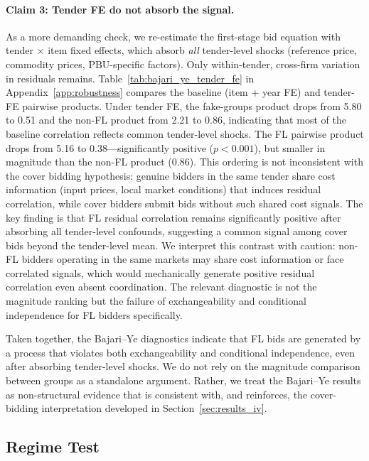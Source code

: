 \paragraph{Claim 3: Tender FE do not absorb the signal.}
As a more demanding check, we re-estimate the first-stage bid equation
with tender $\times$ item fixed effects, which absorb \emph{all}
tender-level shocks (reference price, commodity prices, PBU-specific
factors). Only within-tender, cross-firm variation in residuals remains.
Table~\ref{tab:bajari_ye_tender_fe} in Appendix~\ref{app:robustness}
compares the baseline (item + year FE) and tender-FE pairwise products.
Under tender FE, the fake-groups product drops from 5.80 to 0.51 and
the non-FL product from 2.21 to 0.86, indicating that most of the
baseline correlation reflects common tender-level shocks. The FL pairwise
product drops from 5.16 to 0.38---significantly positive ($p < 0.001$),
but smaller in magnitude than the non-FL product (0.86). This ordering
is not inconsistent with the cover bidding hypothesis: genuine bidders
in the same tender share cost information (input prices, local market
conditions) that induces residual correlation, while cover bidders
submit bids without such shared cost signals. The key finding is that FL
residual correlation remains significantly positive after absorbing all
tender-level confounds, suggesting a common signal among cover bids
beyond the tender-level mean. We interpret this contrast with caution: %
non-FL bidders operating in the same markets may share cost information
or face correlated signals, which would mechanically generate positive
residual correlation even absent coordination. The relevant diagnostic is
not the magnitude ranking but the failure of exchangeability and
conditional independence for FL bidders specifically.

Taken together, the Bajari--Ye diagnostics indicate that FL bids are %
generated by a process that violates both exchangeability and conditional
independence, even after absorbing tender-level shocks. We do not rely on
the magnitude comparison between groups as a standalone argument. Rather,
we treat the Bajari--Ye results as non-structural evidence that is
consistent with, and reinforces, the cover-bidding interpretation
developed in Section~\ref{sec:results_iv}.

\subsection{Regime Test}
\label{sec:results_regime}

